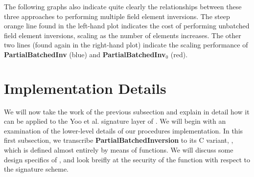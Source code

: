 \noindent
The following graphs also indicate quite clearly the relationships between these three approaches to performing multiple field element inversions. The steep orange line found in the left-hand plot indicates the cost of performing unbatched field element inversions, scaling as the number of elements increases. The other two lines (found again in the right-hand plot) indicate the scaling performance of \textbf{PartialBatchedInv} (blue) and \textbf{PartialBatchedInv}$_0$ (red).

\begin{center}
\end{center}

\section{Implementation Details}
\label{sec:pbinvimplementation}

We will now take the work of the previous subsection and explain in detail how it can be applied to the Yoo et al. signature layer of \sidh. We will begin with an examination of the lower-level details of our procedures implementation. In this first subsection, we transcribe \textbf{PartialBatchedInversion} to its C variant, , which is defined almost entirely by means of  functions. We will discuss some design specifics of , and look breifly at the security of the function with respect to the signature scheme.

